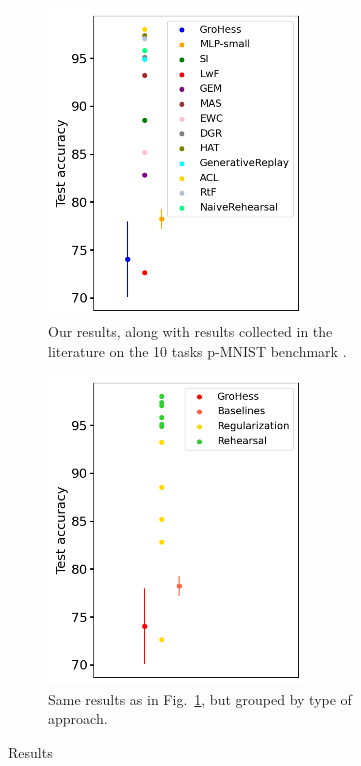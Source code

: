 \documentclass[11pt]{article}
\begin{document}
\begin{figure}
    \centering
    \begin{subfigure}[b]{0.4\textwidth}
        \centering
        \includegraphics[width=0.75\textwidth]{images/lit.png}
        \caption{Our results, along with results collected in the literature on the 10 tasks p-MNIST benchmark \cite{SI}\cite{LwF}\cite{replay_6_GEM}\cite{MAS}\cite{EWC_0}\cite{replay_7_DGR}\cite{HAT}\cite{EWC_6_Adversarial_CL}\cite{replay_5_RtF}.}
        \label{fig:results}
    \end{subfigure}
    \hspace{-0mm}
    \begin{subfigure}[b]{0.4\textwidth}
        \centering
        \includegraphics[width=0.75\textwidth]{images/lit_grouped.png}
        \caption{Same results as in Fig.~\ref{fig:results}, but grouped by type of approach.\\}
        \label{fig:results_grouped}
    \end{subfigure}
    \caption{Results}
\end{figure}
\end{document}
